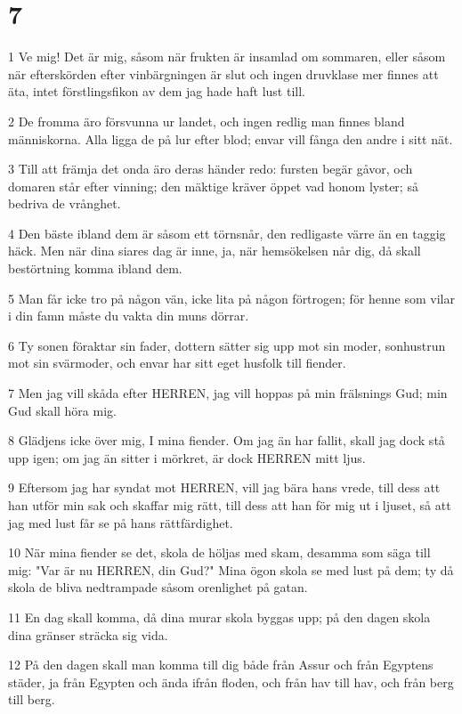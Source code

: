 \chapter{7}

\par 1 Ve mig! Det är mig, såsom när frukten är insamlad om sommaren, eller såsom när efterskörden efter vinbärgningen är slut och ingen druvklase mer finnes att äta, intet förstlingsfikon av dem jag hade haft lust till.
\par 2 De fromma äro försvunna ur landet, och ingen redlig man finnes bland människorna. Alla ligga de på lur efter blod; envar vill fånga den andre i sitt nät.
\par 3 Till att främja det onda äro deras händer redo: fursten begär gåvor, och domaren står efter vinning; den mäktige kräver öppet vad honom lyster; så bedriva de vrånghet.
\par 4 Den bäste ibland dem är såsom ett törnsnår, den redligaste värre än en taggig häck. Men när dina siares dag är inne, ja, när hemsökelsen når dig, då skall bestörtning komma ibland dem.
\par 5 Man får icke tro på någon vän, icke lita på någon förtrogen; för henne som vilar i din famn måste du vakta din muns dörrar.
\par 6 Ty sonen föraktar sin fader, dottern sätter sig upp mot sin moder, sonhustrun mot sin svärmoder, och envar har sitt eget husfolk till fiender.
\par 7 Men jag vill skåda efter HERREN, jag vill hoppas på min frälsnings Gud; min Gud skall höra mig.
\par 8 Glädjens icke över mig, I mina fiender. Om jag än har fallit, skall jag dock stå upp igen; om jag än sitter i mörkret, är dock HERREN mitt ljus.
\par 9 Eftersom jag har syndat mot HERREN, vill jag bära hans vrede, till dess att han utför min sak och skaffar mig rätt, till dess att han för mig ut i ljuset, så att jag med lust får se på hans rättfärdighet.
\par 10 När mina fiender se det, skola de höljas med skam, desamma som säga till mig: "Var är nu HERREN, din Gud?" Mina ögon skola se med lust på dem; ty då skola de bliva nedtrampade såsom orenlighet på gatan.
\par 11 En dag skall komma, då dina murar skola byggas upp; på den dagen skola dina gränser sträcka sig vida.
\par 12 På den dagen skall man komma till dig både från Assur och från Egyptens städer, ja från Egypten och ända ifrån floden, och från hav till hav, och från berg till berg.
